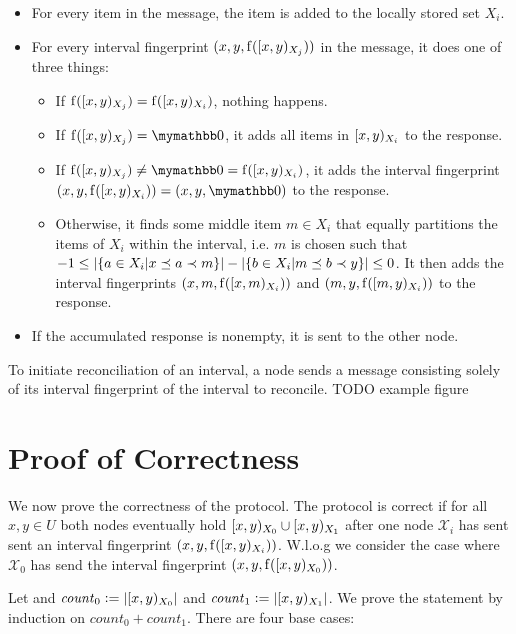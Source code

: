 \begin{itemize}
  \item For every item in the message, the item is added to the locally stored set $X_i$.
  \item For every interval fingerprint $({x}, {y}, {\operatorname{f}([{x},{y})_{X_j})})$ in the message, it does one of three things:
  \begin{itemize}
    \item If $\operatorname{f}([{x},{y})_{X_j}) = \operatorname{f}([{x},{y})_{X_i})$, nothing happens.
    \item If $\fp{\interval{x}{y}{X_j}} = \neutraladd$, it adds all items in $[{x},{y})_{X_i}$ to the response.
    \item If $\fp{\interval{x}{y}{X_j}} \neq \neutraladd = \fp{\interval{x}{y}{X_i}}$, it adds the interval fingerprint $\ifp{x}{y}{X_i} = \ifpmanual{x}{y}{\neutraladd}$ to the response.
    \item Otherwise, it finds some middle item $m \in X_i$ that equally partitions the items of $X_i$ within the interval, i.e. $m$ is chosen such that $-1 \leq |{\{a \in X_i | x \preceq a \prec m\}}| - |{\{b \in X_i | m \preceq b \prec y\}}| \leq 0$. It then adds the interval fingerprints $({x}, {m}, {\operatorname{f}([{x},{m})_{X_i})})$ and $({m}, {y}, {\operatorname{f}([{m},{y})_{X_i})})$ to the response.
  \end{itemize}
  \item If the accumulated response is nonempty, it is sent to the other node.
\end{itemize}

To initiate reconciliation of an interval, a node sends a message consisting solely of its interval fingerprint of the interval to reconcile. TODO example figure

\section{Proof of Correctness}
\label{set-reconciliation-simple-correct}

We now prove the correctness of the protocol. The protocol is correct if for all $x, y \in U$ both nodes eventually hold $[{x},{y})_{X_0} \cup [{x},{y})_{X_1}$ after one node $\mathcal{X}_i$ has sent sent an interval fingerprint $({x}, {y}, {\operatorname{f}([{x},{y})_{X_i})})$. W.l.o.g we consider the case where $\mathcal{X}_0$ has send the interval fingerprint $({x}, {y}, {\operatorname{f}([{x},{y})_{X_0})})$.

\newcommand{\intcount}[1]{\mathit{count}_{#1}}

Let  and $\intcount{0} \defeq \abs{\interval{x}{y}{X_0}}$ and $\intcount{1} \defeq \abs{\interval{x}{y}{X_1}}$.
We prove the statement by induction on $\intcount{0} + \intcount{1}$. There are four base cases:

